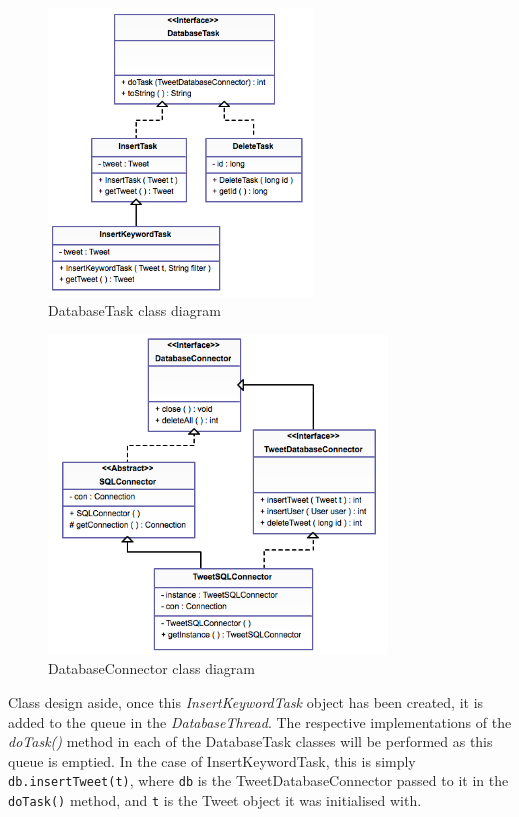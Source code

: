 \begin{figure}[h]
\begin{center}
\includegraphics[width=7cm]{dbtask}
\end{center}
\caption{DatabaseTask class diagram}
\label{fig:dbtask}
\end{figure}

\begin{figure}[h]
\begin{center}
\includegraphics[width=9cm]{dbcon}
\end{center}
\caption{DatabaseConnector class diagram}
\label{fig:dbcon}
\end{figure}

Class design aside, once this \emph{InsertKeywordTask} object has been created, it is added to the queue in the \emph{DatabaseThread}. The respective implementations of the \emph{doTask()} method in each of the DatabaseTask classes will be performed as this queue is emptied. In the case of InsertKeywordTask, this is simply \texttt{db.insertTweet(t)}, where \texttt{db} is the TweetDatabaseConnector passed to it in the \texttt{doTask()} method, and \texttt{t} is the Tweet object it was initialised with.

